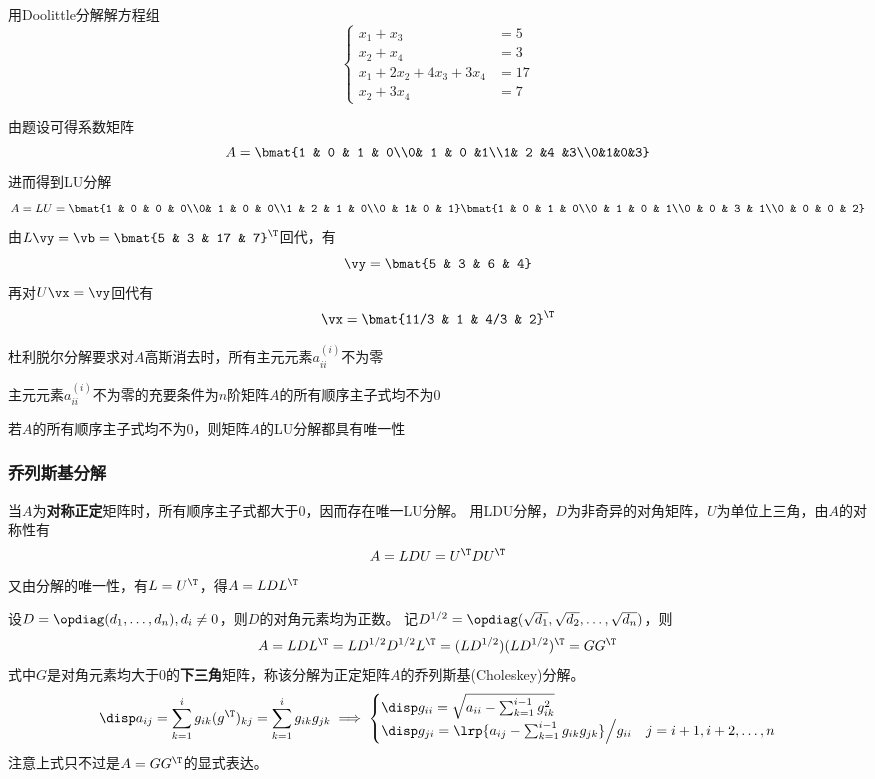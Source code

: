 \begin{example}
    用Doolittle分解解方程组
    \[\begin{cases}
        x_1 + x_3& =5\\
        x_2 + x_4  & =3\\
        x_1 +  2x_2  +  4x_3  +  3x_4 & =17\\
        x_2 +  3x_4 & =7
    \end{cases}\]
\end{example}
\begin{analysis}
    由题设可得系数矩阵
    \[A=\bmat{1 & 0 & 1 & 0\\0& 1 & 0 &1\\1& 2 &4 &3\\0&1&0&3}\]
    进而得到LU分解
    \[A=LU=\bmat{1 & 0 & 0 & 0\\0& 1 & 0 & 0\\1 & 2 & 1 & 0\\0 & 1& 0 & 1}\bmat{1 & 0 & 1 & 0\\0 & 1 & 0 & 1\\0 & 0 & 3 & 1\\0 & 0 & 0 & 2}\]
    由$L\vy=\vb=\bmat{5 & 3 & 17 & 7}^\T$回代，有
    \[\vy=\bmat{5 & 3 & 6 & 4}\]
    再对$U\vx=\vy$回代有
    \[\vx=\bmat{11/3 & 1 & 4/3 & 2}^\T\]
\end{analysis}

杜利脱尔分解要求对$A$高斯消去时，所有主元元素$a_{ii}^{(i)}$不为零
\begin{theorem}
    主元元素$a_{ii}^{(i)}$不为零的充要条件为$n$阶矩阵$A$的所有顺序主子式均不为$0$
\end{theorem}
\begin{theorem}
    若$A$的所有顺序主子式均不为$0$，则矩阵$A$的LU分解都具有唯一性
\end{theorem}

\subsubsection{乔列斯基分解}
当$A$为\textbf{对称正定}矩阵时，所有顺序主子式都大于$0$，因而存在唯一LU分解。
用LDU分解，$D$为非奇异的对角矩阵，$U$为单位上三角，由$A$的对称性有
\[A=LDU=U^\T D U^\T\]
又由分解的唯一性，有$L=U^\T$，得$A=LDL^\T$

设$D=\opdiag(d_1,\ldots,d_n),d_i\ne 0$，则$D$的对角元素均为正数。
记$D^{1/2}=\opdiag(\sqrt{d_1},\sqrt{d_2},\ldots,\sqrt{d_n})$，则
\[A=LDL^\T=LD^{1/2}D^{1/2}L^\T=(LD^{1/2})(LD^{1/2})^\T=GG^\T\]
式中$G$是对角元素均大于$0$的\textbf{下三角}矩阵，称该分解为正定矩阵$A$的乔列斯基(Choleskey)分解。
\[\disp a_{ij}=\sum_{k=1}^i g_{ik}(g^\T)_{kj}=\sum_{k=1}^i g_{ik}g_{jk}
\implies
\begin{cases}
    \disp g_{ii}=\sqrt{a_{ii}-\sum_{k=1}^{i-1}g_{ik}^2}\\
    \disp g_{ji}=\lrp{a_{ij}-\sum_{k=1}^{i-1}g_{ik}g_{jk}}\Big/g_{ii} & j=i+1,i+2,\ldots,n
\end{cases}\]
注意上式只不过是$A=G G^\T$的显式表达。

